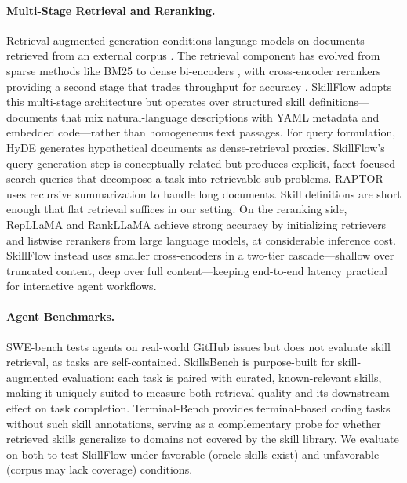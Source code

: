 \documentclass[11pt]{article}
\begin{document}
\paragraph{Multi-Stage Retrieval and Reranking.}
Retrieval-augmented generation conditions language models on documents retrieved from an external corpus \citep{lewis2021retrievalaugmentedgenerationknowledgeintensivenlp}.
The retrieval component has evolved from sparse methods like BM25 \citep{robertson2009probabilistic} to dense bi-encoders \citep{karpukhin-etal-2020-dense}, with cross-encoder rerankers providing a second stage that trades throughput for accuracy \citep{nogueira2020passagererankingbert, nogueira2019multistagedocumentrankingbert}.
SkillFlow adopts this multi-stage architecture but operates over structured skill definitions---documents that mix natural-language descriptions with YAML metadata and embedded code---rather than homogeneous text passages.
For query formulation, HyDE \citep{gao-etal-2023-precise} generates hypothetical documents as dense-retrieval proxies. SkillFlow's query generation step is conceptually related but produces explicit, facet-focused search queries that decompose a task into retrievable sub-problems.
RAPTOR \citep{sarthi2024raptor} uses recursive summarization to handle long documents. Skill definitions are short enough that flat retrieval suffices in our setting.
On the reranking side, RepLLaMA and RankLLaMA \citep{ma2024fine} achieve strong accuracy by initializing retrievers and listwise rerankers from large language models, at considerable inference cost.
SkillFlow instead uses smaller cross-encoders in a two-tier cascade---shallow over truncated content, deep over full content---keeping end-to-end latency practical for interactive agent workflows.

\paragraph{Agent Benchmarks.}
SWE-bench \citep{jimenez2024swebench} tests agents on real-world GitHub issues but does not evaluate skill retrieval, as tasks are self-contained.
SkillsBench \citep{li_skillsbench_2026} is purpose-built for skill-augmented evaluation: each task is paired with curated, known-relevant skills, making it uniquely suited to measure both retrieval quality and its downstream effect on task completion.
Terminal-Bench \citep{merrill2026terminalbench} provides terminal-based coding tasks without such skill annotations, serving as a complementary probe for whether retrieved skills generalize to domains not covered by the skill library.
We evaluate on both to test SkillFlow under favorable (oracle skills exist) and unfavorable (corpus may lack coverage) conditions.
\end{document}
